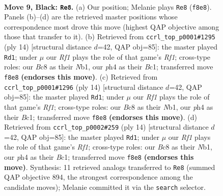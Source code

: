 \documentclass[11pt]{article}
\begin{document}
\clearpage

\begin{figure}[p]\centering
\begin{subfigure}{0.46\textwidth}\centering
\resizebox{\linewidth}{!}{%
\newchessgame
\chessboard[
  setfen={rnb2rk1/ppq1bppp/4pn2/2pp4/2P1P2P/3P1NP1/PP1N1PB1/R1BQ1RK1 b - - 0 9},
  showmover=false,
  pgfstyle=straightmove, color=movearrow, markmove={f8-e8}
]}
\caption{}
\end{subfigure}\hfill
\begin{subfigure}{0.46\textwidth}\centering
\resizebox{\linewidth}{!}{%
\newchessgame
\chessboard[
  setfen={r1bq1rk1/pppn1pbp/3p1np1/4p3/2PP4/5NP1/PPQ1PPBP/RNB2RK1 w - - 0 8},
  showmover=false,
  pgfstyle=straightmove, color=movearrow, markmove={f1-d1}
]}
\caption{}
\end{subfigure}
\\[4pt]
\begin{subfigure}{0.46\textwidth}\centering
\resizebox{\linewidth}{!}{%
\newchessgame
\chessboard[
  setfen={r1bq1rk1/pppn1pbp/3p1np1/4p3/2PP4/5NP1/PPQ1PPBP/RNB2RK1 w - - 0 8},
  showmover=false,
  pgfstyle=straightmove, color=movearrow, markmove={f1-d1}
]}
\caption{}
\end{subfigure}\hfill
\begin{subfigure}{0.46\textwidth}\centering
\resizebox{\linewidth}{!}{%
\newchessgame
\chessboard[
  setfen={r1bq1rk1/pppn1pbp/3p1np1/4p3/2PP4/5NP1/PPQ1PPBP/RNB2RK1 w - - 0 8},
  showmover=false,
  pgfstyle=straightmove, color=movearrow, markmove={f1-d1}
]}
\caption{}
\end{subfigure}
\caption{\textbf{Move 9, Black: \texttt{Re8}.} (a) Our position; Melanie plays \texttt{Re8} (\texttt{f8e8}). Panels (b)--(d) are the retrieved master positions whose correspondence most drove this move (highest QAP objective among those that transfer to it). (b) Retrieved from \texttt{ccrl\_top\_p0001\#1295} (ply 14) [structural distance $d$=42, QAP obj=85]: the master played \texttt{Rd1}; under $\mu$ our \emph{Rf1} plays the role of that game's \emph{Rf1}; cross-type roles: our \emph{B}c8 as their \emph{N}b1, our \emph{p}h4 as their \emph{B}c1; transferred move \texttt{f8e8} \textbf{(endorses this move)}. (c) Retrieved from \texttt{ccrl\_top\_p0001\#1296} (ply 14) [structural distance $d$=42, QAP obj=85]: the master played \texttt{Rd1}; under $\mu$ our \emph{Rf1} plays the role of that game's \emph{Rf1}; cross-type roles: our \emph{B}c8 as their \emph{N}b1, our \emph{p}h4 as their \emph{B}c1; transferred move \texttt{f8e8} \textbf{(endorses this move)}. (d) Retrieved from \texttt{ccrl\_top\_p0002\#259} (ply 14) [structural distance $d$=42, QAP obj=85]: the master played \texttt{Rd1}; under $\mu$ our \emph{Rf1} plays the role of that game's \emph{Rf1}; cross-type roles: our \emph{B}c8 as their \emph{N}b1, our \emph{p}h4 as their \emph{B}c1; transferred move \texttt{f8e8} \textbf{(endorses this move)}. Synthesis: 11 retrieved analogs transferred to \texttt{Re8} (summed QAP objective 894, the strongest correspondence among the candidate moves); Melanie committed it via the \texttt{search} selector.}
\label{fig:thought-m17}
\end{figure}
\end{document}
